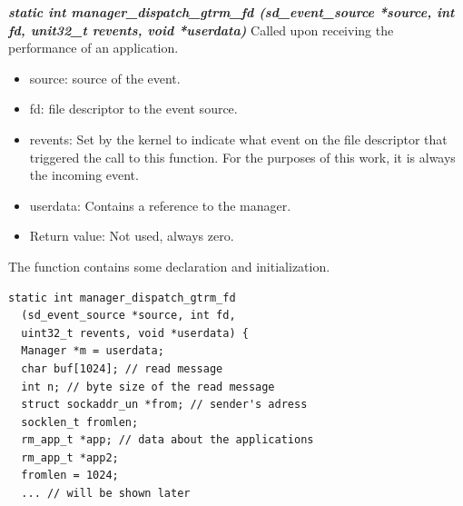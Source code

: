 \documentclass[nobiblatex]{LTHthesis}
\begin{document}
\begin{framed}
	\begin{flushleft}
		\textbf{\emph{static int manager\_dispatch\_gtrm\_fd \newline
      (sd\_event\_source *source, int fd, unit32\_t revents, void *userdata)}} \newline 
			Called upon receiving the performance of an application.
			\begin{itemize}
			\item source: source of the event.
			\item fd: file descriptor to the event source.
			\item revents: Set by the kernel to indicate what event on the file
        descriptor that triggered the call to this function. For the purposes
        of this work, it is always the incoming event.
			\item userdata: Contains a reference to the manager.
			\item Return value: Not used, always zero.
			\end{itemize}
	\end{flushleft}	
\end{framed}

The function contains some declaration and initialization.
\begin{lstlisting}
static int manager_dispatch_gtrm_fd
  (sd_event_source *source, int fd,
  uint32_t revents, void *userdata) {
  Manager *m = userdata;    		    
  char buf[1024]; // read message
  int n; // byte size of the read message
  struct sockaddr_un *from; // sender's adress
  socklen_t fromlen;
  rm_app_t *app; // data about the applications
  rm_app_t *app2;	
  fromlen = 1024;
  ... // will be shown later
\end{lstlisting}
\end{document}
